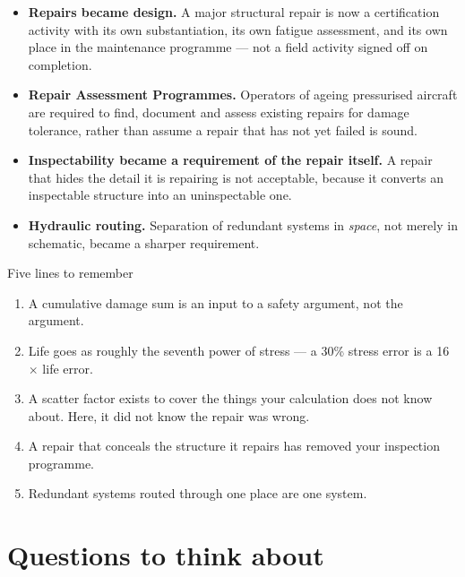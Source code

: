 \documentclass[11pt,a4paper]{article}
\begin{document}
\begin{itemize}[nosep,leftmargin=1.4em]
  \item \textbf{Repairs became design.} A major structural repair is now a certification activity with its own substantiation, its own fatigue assessment, and its own place in the maintenance programme --- not a field activity signed off on completion.
  \item \textbf{Repair Assessment Programmes.} Operators of ageing pressurised aircraft are required to find, document and assess existing repairs for damage tolerance, rather than assume a repair that has not yet failed is sound.
  \item \textbf{Inspectability became a requirement of the repair itself.} A repair that hides the detail it is repairing is not acceptable, because it converts an inspectable structure into an uninspectable one.
  \item \textbf{Hydraulic routing.} Separation of redundant systems in \emph{space}, not merely in schematic, became a sharper requirement.
\end{itemize}

\begin{sumbox}{Five lines to remember}
\begin{enumerate}[nosep]
  \item A cumulative damage sum is an input to a safety argument, not the argument.
  \item Life goes as roughly the seventh power of stress --- a 30\% stress error is a 16$\times$ life error.
  \item A scatter factor exists to cover the things your calculation does not know about. Here, it did not know the repair was wrong.
  \item A repair that conceals the structure it repairs has removed your inspection programme.
  \item Redundant systems routed through one place are one system.
\end{enumerate}
\end{sumbox}

\section{Questions to think about}
\end{document}
